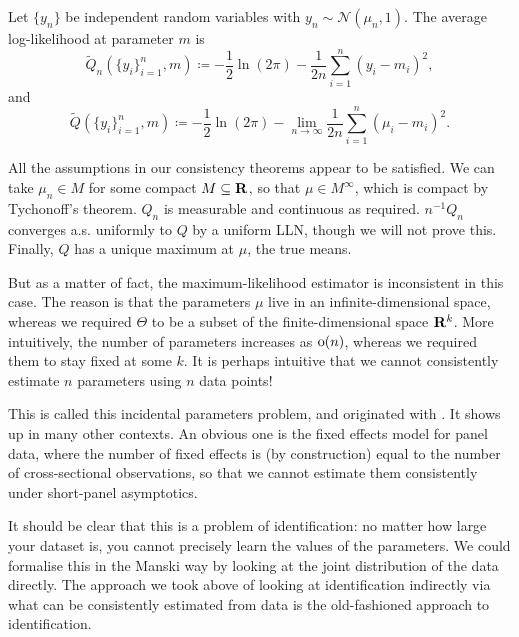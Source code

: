 \documentclass[11pt,letterpaper,reqno,oneside]{article}
\begin{document}
\begin{example}
	Let $\{ y_n \}$ be independent random variables with $y_n \sim \mathcal{N}(\mu_n,1)$. The average log-likelihood at parameter $m$ is
	\begin{equation*}
		\widetilde{Q}_n(\{y_i\}_{i=1}^n,m) 
		\coloneqq 
		-\frac{1}{2} \ln(2\pi) - \frac{1}{2 n} \sum_{i=1}^n (y_i-m_i)^2 ,
	\end{equation*}
	and
	\begin{equation*}
		\widetilde{Q}(\{y_i\}_{i=1}^n,m) 
		\coloneqq -\frac{1}{2} \ln(2\pi)
		- \lim_{n\to\infty} \frac{1}{2 n} \sum_{i=1}^n (\mu_i-m_i)^2 .
	\end{equation*}

	All the assumptions in our consistency theorems appear to be satisfied. We can take $\mu_n \in M$ for some compact $M \subseteq \mathbf{R}$, so that $\mu \in M^\infty$, which is compact by Tychonoff's theorem. $Q_n$ is measurable and continuous as required. $n^{-1} Q_n$ converges a.s. uniformly to $Q$ by a uniform LLN, though we will not prove this. Finally, $Q$ has a unique maximum at $\mu$, the true means.

	But as a matter of fact, the maximum-likelihood estimator is inconsistent in this case. The reason is that the parameters $\mu$ live in an infinite-dimensional space, whereas we required $\Theta$ to be a subset of the finite-dimensional space $\mathbf{R}^k$. More intuitively, the number of parameters increases as $\mathrm{o}(n)$, whereas we required them to stay fixed at some $k$. It is perhaps intuitive that we cannot consistently estimate $n$ parameters using $n$ data points!

	This is called this incidental parameters problem, and originated with \textcite{NeymanScott1948}. It shows up in many other contexts. An obvious one is the fixed effects model for panel data, where the number of fixed effects is (by construction) equal to the number of cross-sectional observations, so that we cannot estimate them consistently under short-panel asymptotics.

	It should be clear that this is a problem of identification: no matter how large your dataset is, you cannot precisely learn the values of the parameters. We could formalise this in the Manski way by looking at the joint distribution of the data directly. The approach we took above of looking at identification indirectly via what can be consistently estimated from data is the old-fashioned approach to identification.
\end{example}
\end{document}
